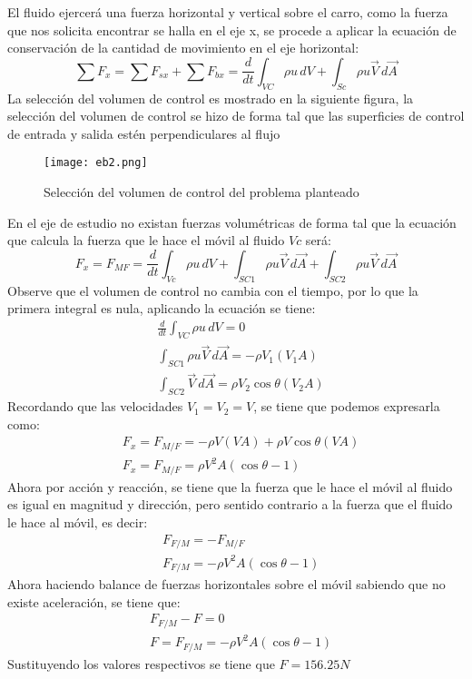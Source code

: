 El fluido ejercerá una fuerza horizontal y vertical sobre el carro, como la fuerza que nos solicita encontrar se halla en el eje x, se procede a aplicar la ecuación de conservación de la cantidad de movimiento en el eje horizontal:
\begin{equation*}
    \sum F_x = \sum F_{sx} + \sum F_{bx} = \frac{d}{dt} \int_{VC} \rho u\, dV +\int_{Sc} \rho u \vec{V}\, d\vec{A}
\end{equation*}
La selección del volumen de control es mostrado en la siguiente figura, la selección del volumen de control se hizo de forma tal que las superficies de control de entrada y salida estén perpendiculares al flujo
\begin{figure}[h!]
    \centering
      \texttt{[image: eb2.png]}
      \caption{Selección del volumen de control del problema planteado}
      \label{eb2}
    \end{figure}
En el eje de estudio no existan fuerzas volumétricas de forma tal que la ecuación que calcula la fuerza que le hace el móvil al fluido $Vc$ será:
\begin{equation*}
    F_x = F_{MF} = \frac{d}{dt} \int_{Vc}\rho u\, dV + \int_{SC1} \rho u \vec{V}\, d\vec{A} + \int_{SC2}\rho u \vec{V}\, d\vec{A}
\end{equation*}
Observe que el volumen de control no cambia con el tiempo, por lo que la primera integral es nula, aplicando la ecuación se tiene:
\begin{align*}
    &\frac{d}{dt}\int_{VC}\rho u\,dV = 0\\
    &\int_{SC1}\rho u \vec{V}\, d\vec{A} =-\rho V_1\left(V_1A\right)\\
    &\int_{SC2}\vec{V}\,d\vec{A} =\rho V_2\cos{\theta}\left(V_2A\right)
\end{align*}
Recordando que las velocidades $V_1=V_2=V$, se tiene que podemos expresarla como:
\begin{align*}
    &F_x = F_{M/F} =-\rho V(VA) +\rho V\cos{\theta}(VA)\\
    &F_x = F_{M/F} = \rho V^2A(\cos{\theta} - 1)
\end{align*}
Ahora por acción y reacción, se tiene que la fuerza que le hace el móvil al fluido es igual en magnitud y dirección, pero sentido contrario a la fuerza que el fluido le hace al móvil, es decir:
\begin{align*}
    &F_{F/M} = - F_{M/F}\\
    &F_{F/M} = -\rho V^2A\left(\cos{\theta} - 1 \right)
\end{align*}
Ahora haciendo balance de fuerzas horizontales sobre el móvil sabiendo que no existe aceleración, se tiene que:
\begin{align*}
    &F_{F/M} - F = 0\\
    &F = F_{F/M} = -\rho V^2A\left(\cos{\theta}- 1 \right)
\end{align*}
Sustituyendo los valores respectivos se tiene que $F=156.25N$

